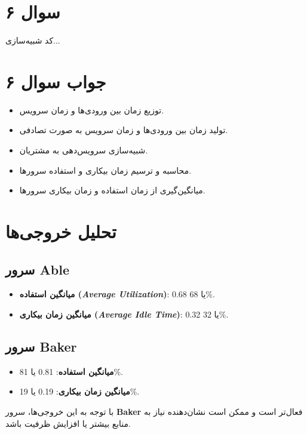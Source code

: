 \section*{سوال ۶}

کد شبیه‌سازی...
\section*{جواب سوال ۶}

\begin{itemize}
	\item توزیع زمان بین ورودی‌ها و زمان سرویس.
	\item تولید زمان بین ورودی‌ها و زمان سرویس به صورت تصادفی.
	\item شبیه‌سازی سرویس‌دهی به مشتریان.
	\item محاسبه و ترسیم زمان بیکاری و استفاده سرورها.
	\item میانگین‌گیری از زمان استفاده و زمان بیکاری سرورها.
\end{itemize}

\section*{تحلیل خروجی‌ها}

\subsection*{سرور Able}
\begin{itemize}
	\item \textbf{میانگین استفاده (\textit{Average Utilization})}: 0.68 یا 68\%. 
	\item \textbf{میانگین زمان بیکاری (\textit{Average Idle Time})}: 0.32 یا 32\%.
\end{itemize}

\subsection*{سرور Baker}
\begin{itemize}
	\item \textbf{میانگین استفاده}: 0.81 یا 81\%.
	\item \textbf{میانگین زمان بیکاری}: 0.19 یا 19\%.
\end{itemize}

با توجه به این خروجی‌ها، سرور \textbf{Baker} فعال‌تر است و ممکن است نشان‌دهنده نیاز به منابع بیشتر یا افزایش ظرفیت باشد.
